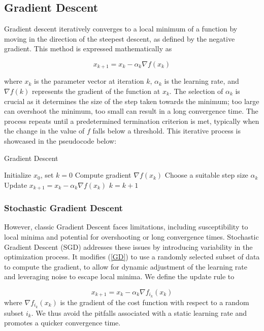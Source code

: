 \documentclass[a4paper]{report}
\begin{document}
\subsection{Gradient Descent}
Gradient descent iteratively converges to a local minimum of a function by moving in the direction of the steepest descent, as defined by the negative gradient. This method is expressed mathematically as

\begin{equation}\label{GD}
    x_{k+1} = x_k - \alpha_k \nabla f(x_k)
\end{equation}

where $x_k$ is the parameter vector at iteration $k$, $\alpha_k$ is the learning rate, and $\nabla f(k)$ represents the gradient of the function at $x_k$. The selection of $\alpha_k$ is crucial as it determines the size of the step taken towards the minimum; too large can overshoot the minimum, too small can result in a long convergence time. The process repeats until a predetermined termination criterion is met, typically when the change in the value of $f$ falls below a threshold. This iterative process is showcased in the pseudocode below:

\begin{algorithm}
\caption{Gradient Descent}
\begin{algorithmic}[1]
\State Initialize \( x_0 \), set \( k = 0 \)
    \State Compute gradient \( \nabla f(x_k) \)
    \State Choose a suitable step size \( \alpha_k \)
    \State Update \( x_{k+1} = x_k - \alpha_k \nabla f(x_k) \)
    \State \( k = k + 1 \)
\EndWhile
\end{algorithmic}
\end{algorithm}

\subsubsection{Stochastic Gradient Descent}

However, classic Gradient Descent faces limitations, including susceptibility to local minima and potential for overshooting or long convergence times. Stochastic Gradient Descent (SGD) addresses these issues by introducing variability in the optimization process. It modifies (\ref{GD}) to use a randomly selected subset of data to compute the gradient, to allow for dynamic adjustment of the learning rate and leveraging noise to escape local minima. We define the update rule to 

\begin{equation}\label{SGD}
x_{k+1} = x_k - \alpha_k \nabla f_{i_k}(x_k)	
\end{equation}
where $\nabla f_{i_k}(x_k)$ is the gradient of the cost function with respect to a random subset $i_k$. We thus avoid the pitfalls associated with a static learning rate and promotes a quicker convergence time.
\end{document}
